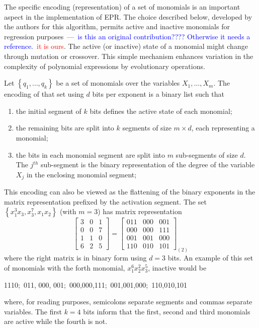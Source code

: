 \documentclass[review,preprint]{elsarticle}
\newcommand{\nth}{\ensuremath{^{th}}}
\newcommand{\review}[1]{\textcolor{blue}{~---~#1}}
\newcommand{\revised}[2]{\review{#1}~\textcolor{red}{#2}}
\begin{document}
The specific encoding (representation) of a set of monomials is an important aspect in the implementation of \ac{EPR}. The choice described below, developed by the authors for this algorithm, permits active and inactive monomials for regression purposes\revised{is this an original contribution????  Otherwise it needs a reference.}{it is ours}. The active (or inactive) state of a monomial might change through mutation or crossover. This simple mechanism enhances variation in the complexity of polynomial expressions by evolutionary operations.

Let  $\left\lbrace q_1, \ldots, q_k\right\rbrace$ be a set of monomials over the variables $X_1, \ldots, X_m$. The encoding of that set using $d$ bits per exponent is a binary list such that
\begin{enumerate}
\item the initial segment of $k$ bits defines the active state of each monomial;
\item the remaining bits are split into $k$ segments of size $m\times d$, each representing a monomial;
\item the bits in each monomial segment are split into $m$ sub-segments of size $d$. The $j\nth$ sub-segment is the binary representation of the degree of the variable $X_j$ in the enclosing monomial segment;
\end{enumerate}
This encoding can also be viewed as the flattening of the binary exponents in the matrix representation prefixed by the activation segment. The set $\left\lbrace x_1^3 x_3, x_3^7, x_1 x_2\right\rbrace$ (with $m = 3$) has matrix representation
$$\left[ 
\begin{array}{ccc}
3 & 0 & 1 \\
0 & 0 & 7 \\
1 & 1 & 0 \\
6 & 2 & 5
\end{array}
\right] = \left[ 
\begin{array}{ccc}
011 & 000 & 001 \\
000 & 000 & 111 \\
001 & 001 & 000 \\
110 & 010 & 101
\end{array}
\right]_{\left( 2 \right)}
$$
where the right matrix is in binary form using $d = 3$ bits. An example of this set of monomials with the forth monomial, $x_1^6x_2^2x_3^5$, inactive would be
\begin{center}
1110;~011, 000, 001;~000,000,111;~001,001,000;~110,010,101
\end{center}
where, for reading purposes, semicolons separate segments and commas separate variables. The first $k=4$ bits inform that the first, second and third monomials are active while the fourth is not.
\end{document}
